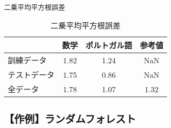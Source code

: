 \documentclass[9pt]{ltjsarticle}
\begin{document}
\newpage
    \begin{center}
    \end{center}
    { \hspace*{\fill} \\}
    
    \begin{center}
    \end{center}
    
    \begin{center}
    \end{center}
    
         \begin{table}[h]
\caption{二乗平均平方根誤差}
\begin{center}
二乗平均平方根誤差\\
\begin{tabular}{l|ccc}
     &    数学 & ポルトガル語 &  参考値 \cite{cortez} \\
      \hline \hline
訓練データ  & 1.82   & 1.24  & NaN \\
テストデータ & 1.75 &   0.86  & NaN \\
全データ   & 1.78 &   1.07  &1.32
\end{tabular}
\end{center}
\label{default}
\end{table}%

        
        
    \hypertarget{ux4f5cux4f8bux30e9ux30f3ux30c0ux30e0ux30d5ux30a9ux30ecux30b9ux30c8}{%
\subsection{【作例】ランダムフォレスト}\label{ux4f5cux4f8bux30e9ux30f3ux30c0ux30e0ux30d5ux30a9ux30ecux30b9ux30c8}}
\end{document}
